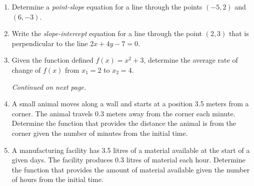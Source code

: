 

\begin{enumerate}
\item Determine a \emph{point-slope} equation for a line through the
  points $(-5,2)$ and $(6,-3)$.

  \vfill
  
\item Write the \emph{slope-intercept} equation for a line through the
  point $(2,3)$ that is perpendicular to the line $2x+4y-7=0$.

\vfill

\item Given the function defined $f(x)=x^2+3$, determine the average
  rate of change of $f(x)$ from $x_1=2$ to $x_2=4$.

  \vfill

  \textit{Continued on next page.}
  
\clearpage

\item A small animal moves along a wall and starts at a position 3.5
  meters from a corner.  The animal travels 0.3 meters away from the
  corner each minute. Determine the function that provides the
  distance the animal is from the corner given the number of minutes
  from the initial time.

  \vfill

\item A manufacturing facility has 3.5 litres of a material available
  at the start of a given days. The facility produces 0.3 litres of
  material each hour. Determine the function that provides the amount
  of material available given the number of hours from the initial
  time.

  \vfill

\end{enumerate}



